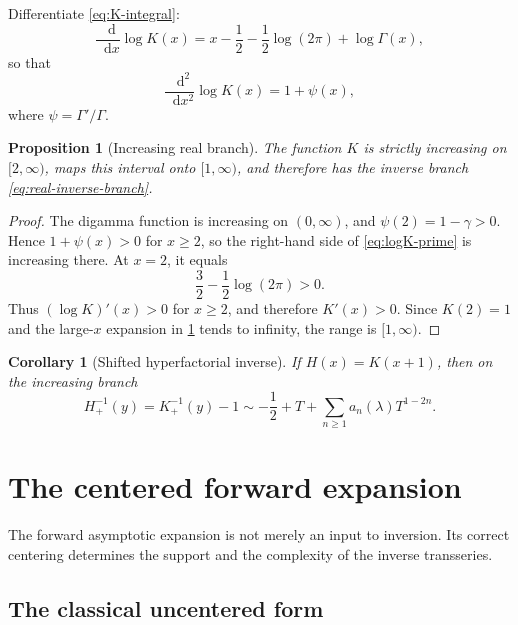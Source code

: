 \documentclass[11pt,oneside]{article}
\theoremstyle{plain}
\newtheorem{proposition}[theorem]{Proposition}
\newtheorem{corollary}[theorem]{Corollary}
\theoremstyle{definition}
\theoremstyle{remark}
\newcommand{\dd}{\mathop{}\!\mathrm{d}}
\begin{document}
Differentiate \cref{eq:K-integral}:
\begin{equation}
 \frac{\dd}{\dd x}\log K(x)
 =x-\frac12-\frac12\log(2\pi)+\log\Gamma(x),
 \label{eq:logK-prime}
\end{equation}
so that
\begin{equation}
 \frac{\dd^2}{\dd x^2}\log K(x)=1+\psi(x),
 \label{eq:logK-second}
\end{equation}
where \(\psi=\Gamma'/\Gamma\).

\begin{proposition}[Increasing real branch]
\label{prop:monotone}
The function \(K\) is strictly increasing on \([2,\infty)\), maps this interval
onto \([1,\infty)\), and therefore has the inverse branch
\cref{eq:real-inverse-branch}.
\end{proposition}

\begin{proof}
The digamma function is increasing on \((0,\infty)\), and
\(\psi(2)=1-\gamma>0\).  Hence \(1+\psi(x)>0\) for \(x\ge2\), so the right-hand
side of \cref{eq:logK-prime} is increasing there.  At \(x=2\), it equals
\begin{equation*}
 \frac32-\frac12\log(2\pi)>0.
\end{equation*}
Thus \((\log K)'(x)>0\) for \(x\ge2\), and therefore \(K'(x)>0\).  Since
\(K(2)=1\) and the large-\(x\) expansion in \cref{sec:centered-source} tends to
infinity, the range is \([1,\infty)\).
\end{proof}

\begin{corollary}[Shifted hyperfactorial inverse]
\label{cor:H-inverse}
If \(H(x)=K(x+1)\), then on the increasing branch
\begin{equation}
 H_+^{-1}(y)=K_+^{-1}(y)-1
 \sim -\frac12+T+\sum_{n\ge1}a_n(\lambda)T^{1-2n}.
 \label{eq:H-inverse}
\end{equation}
\end{corollary}

\section{The centered forward expansion}
\label{sec:centered-source}

The forward asymptotic expansion is not merely an input to inversion.  Its
correct centering determines the support and the complexity of the inverse
transseries.

\subsection{The classical uncentered form}
\end{document}
